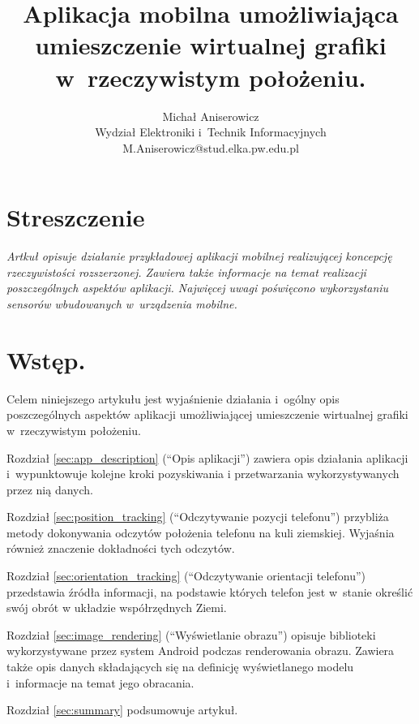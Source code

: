 \documentclass[a4paper,twocolumn,11pt]{article}
\title{{\mycfsb{14} Aplikacja mobilna umożliwiająca umieszczenie wirtualnej grafiki w~rzeczywistym położeniu.}}
\author{{\mycfs{12} Michał Aniserowicz} \\ {\mycfs{11} Wydział Elektroniki i~Technik Informacyjnych} \\ {\mycfs{11} M.Aniserowicz@stud.elka.pw.edu.pl}}
\date{}
\begin{document}
\vspace{1.5cm}

\maketitle




\section*{Streszczenie}

\emph{
 Artkuł opisuje działanie przykładowej aplikacji mobilnej realizującej koncepcję rzeczywistości rozszerzonej.
 Zawiera także informacje na temat realizacji poszczególnych aspektów aplikacji.
 Najwięcej uwagi poświęcono wykorzystaniu sensorów wbudowanych w~urządzenia mobilne.
}




\section{Wstęp.}

Celem niniejszego artykułu jest wyjaśnienie działania i~ogólny opis poszczególnych aspektów aplikacji umożliwiającej umieszczenie wirtualnej grafiki w~rzeczywistym położeniu.

Rozdział \ref{sec:app_description} (``Opis aplikacji'') zawiera opis działania aplikacji i~wypunktowuje kolejne kroki pozyskiwania i przetwarzania wykorzystywanych przez nią danych.

Rozdział \ref{sec:position_tracking} (``Odczytywanie pozycji telefonu'') przybliża metody dokonywania odczytów położenia telefonu na kuli ziemskiej.
Wyjaśnia również znaczenie dokładności tych odczytów.

Rozdział \ref{sec:orientation_tracking} (``Odczytywanie orientacji telefonu'') przedstawia źródła informacji, na podstawie których telefon jest w~stanie określić swój obrót w układzie współrzędnych Ziemi.

Rozdział \ref{sec:image_rendering} (``Wyświetlanie obrazu'') opisuje biblioteki wykorzystywane przez system Android podczas renderowania obrazu. Zawiera także opis danych składających się na definicję wyświetlanego modelu i~informacje na temat jego obracania.

Rozdział \ref{sec:summary} podsumowuje artykuł.
\end{document}
